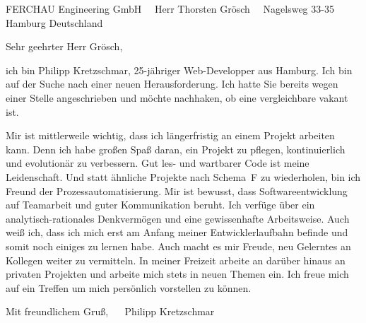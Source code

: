 \documentclass[paper=a4,pagesize]{scrlttr2}
\renewcommand{\\}{\ {\large\textperiodcentered}\ }
\begin{document}

\begin{letter}{ %
FERCHAU Engineering GmbH\\
Herr Thorsten Grösch\\
Nagelsweg 33-35 Hamburg
Deutschland
}


\opening{Sehr geehrter Herr Grösch,}

ich bin Philipp Kretzschmar, 25-jähriger Web-Developper aus Hamburg. Ich bin auf der Suche nach einer neuen Herausforderung. Ich hatte Sie bereits wegen einer Stelle angeschrieben und möchte nachhaken, ob eine vergleichbare vakant ist.\\

Mir ist mittlerweile wichtig, dass ich längerfristig an einem Projekt arbeiten kann. Denn ich habe großen Spaß daran, ein Projekt zu pflegen, kontinuierlich und evolutionär zu verbessern. Gut les- und wartbarer Code ist meine Leidenschaft. Und statt ähnliche Projekte nach Schema F zu wiederholen, bin ich Freund der Prozessautomatisierung. Mir ist bewusst, dass Softwareentwicklung auf Teamarbeit und guter Kommunikation beruht. Ich verfüge über ein analytisch-rationales Denkvermögen und eine gewissenhafte Arbeitsweise. Auch weiß ich, dass ich mich erst am Anfang meiner Entwicklerlaufbahn befinde und somit noch einiges zu lernen habe. Auch macht es mir Freude, neu Gelerntes an Kollegen weiter zu vermitteln. In meiner Freizeit arbeite an darüber hinaus an privaten Projekten und arbeite mich stets in neuen Themen ein. Ich freue mich auf ein Treffen um mich persönlich vorstellen zu können. \\

Mit freundlichem Gruß, \\
Philipp Kretzschmar


\end{letter}
\end{document}
